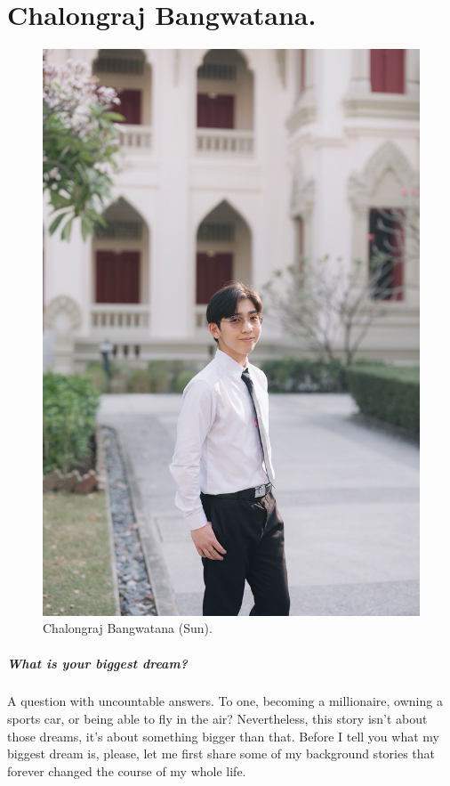 \documentclass[11pt]{book}
\begin{document}

		\chapter{Chalongraj Bangwatana.}
		\begin{figure}[H]
							\begin{center}
  							\includegraphics[scale=0.125]{Photos/Chalongraj_Bangwatana.jpg}
  							\end{center}
 							\caption{Chalongraj Bangwatana (Sun).}
		\end{figure}

		\paragraph{What is your biggest dream?}
A question with uncountable  answers. To one, becoming a millionaire, owning a sports car, or being able to fly in the air? Nevertheless, this story isn’t about those dreams, it’s about something bigger than that. Before I tell you what my biggest dream is, please, let me first share some of my background stories that forever changed the course of my whole life.\\
\end{document}
